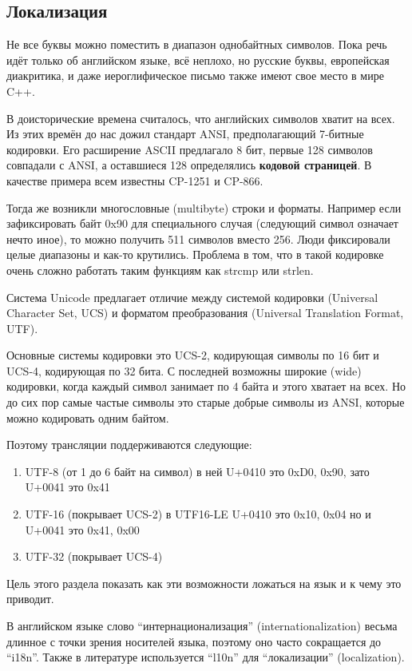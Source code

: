 \documentclass[a4paper,12pt,oneside]{article}
\begin{document}
\pagebreak
\subsection{Локализация}\label{Localization}

Не все буквы можно поместить в диапазон однобайтных символов. Пока речь идёт только об английском языке, всё неплохо, но русские буквы, европейская диакритика, и даже иероглифическое письмо также имеют свое место в мире C++.

В доисторические времена считалось, что английских символов хватит на всех. Из этих времён до нас дожил стандарт ANSI, предполагающий 7-битные кодировки. Его расширение ASCII предлагало 8 бит, первые 128 символов совпадали с ANSI, а оставшиеся 128 определялись \textbf{кодовой страницей}. В качестве примера всем известны CP-1251 и CP-866.

Тогда же возникли многословные (multibyte) строки и форматы. Например если зафиксировать байт 0x90 для специального случая (следующий символ означает нечто иное), то можно получить 511 символов вместо 256. Люди фиксировали целые диапазоны и как-то крутились. Проблема в том, что в такой кодировке очень сложно работать таким функциям как strcmp или strlen.

Система Unicode предлагает отличие между системой кодировки (Universal Character Set, UCS) и форматом преобразования (Universal Translation Format, UTF). 

Основные системы кодировки это UCS-2, кодирующая символы по 16 бит и UCS-4, кодирующая по 32 бита. С последней возможны широкие (wide) кодировки, когда каждый символ занимает по 4 байта и этого хватает на всех. Но до сих пор самые частые символы это старые добрые символы из ANSI, которые можно кодировать одним байтом.

Поэтому трансляции поддерживаются следующие:

\begin{enumerate}
\item UTF-8 (от 1 до 6 байт на символ) в ней U+0410 это {0xD0, 0x90}, зато U+0041 это {0x41}
\item UTF-16 (покрывает UCS-2) в UTF16-LE U+0410 это {0x10, 0x04} но и U+0041 это {0x41, 0x00}
\item UTF-32 (покрывает UCS-4)
\end{enumerate}

Цель этого раздела показать как эти возможности ложаться на язык и к чему это приводит.

В английском языке слово ``интернационализация'' (internationalization) весьма длинное с точки зрения носителей языка, поэтому оно часто сокращается до ``i18n''. Также в литературе используется ``l10n'' для ``локализации'' (localization).
\end{document}
